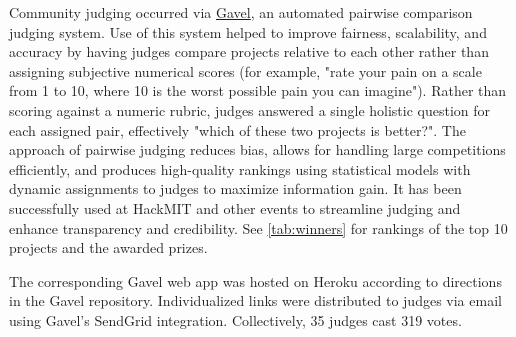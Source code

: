 \documentclass[superscriptaddress, nofootinbib,  amsmath, amssymb, twocolumn]{revtex4-2} %
\begin{document}
Community judging occurred via \href{https://github.com/anishathalye/gavel}{Gavel}, an automated pairwise comparison judging system. Use of this system helped to improve fairness, scalability, and accuracy by having judges compare projects relative to each other rather than assigning subjective numerical scores (for example, "rate your pain on a scale from 1 to 10, where 10 is the worst possible pain you can imagine"). Rather than scoring against a numeric rubric, judges answered a single holistic question for each assigned pair, effectively "which of these two projects is better?". The approach of pairwise judging reduces bias, allows for handling large competitions efficiently, and produces high-quality rankings using statistical models with dynamic assignments to judges to maximize information gain. It has been successfully used at HackMIT and other events to streamline judging and enhance transparency and credibility. See \cref{tab:winners} for rankings of the top 10 projects and the awarded prizes.

The corresponding Gavel web app was hosted on Heroku according to directions in the Gavel repository. Individualized links were distributed to judges via email using Gavel's SendGrid integration. Collectively, 35 judges cast 319 votes.
\end{document}
